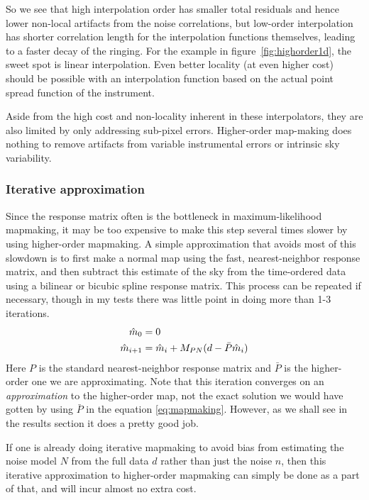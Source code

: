 \documentclass{article}
\begin{document}
So we see that high interpolation order has smaller total residuals and hence lower
non-local artifacts from the noise correlations, but low-order interpolation has shorter
correlation length for the interpolation functions themselves, leading to a faster decay of
the ringing. For the example in figure~\ref{fig:highorder1d}, the sweet spot is linear interpolation.
Even better locality (at even higher cost) should be possible with an interpolation
function based on the actual point spread function of the instrument.

Aside from the high cost and non-locality inherent in these interpolators, they are also
limited by only addressing sub-pixel errors. Higher-order map-making does nothing to remove
artifacts from variable instrumental errors or intrinsic sky variability.

\subsubsection{Iterative approximation}
Since the response matrix often is the bottleneck in maximum-likelihood mapmaking,
it may be too expensive to make this step several times slower by using higher-order
mapmaking. A simple approximation that avoids most of this slowdown is to first make
a normal map using the fast, nearest-neighbor response matrix, and then subtract this
estimate of the sky from the time-ordered data using a bilinear or bicubic spline
response matrix. This process can be repeated if necessary, though in my tests there
was little point in doing more than 1-3 iterations.
\begin{align}
\hat m_0 &= 0 \notag \\
\hat m_{i+1} &= \hat m_i + M_{PN}(d - \bar P \hat m_i) \label{eq:iterative}
\end{align}
Here $P$ is the standard nearest-neighbor response matrix and $\bar P$ is
the higher-order one we are approximating. Note that this iteration converges
on an \emph{approximation} to the higher-order map, not the exact solution
we would have gotten by using $\bar P$ in the equation \ref{eq:mapmaking}.
However, as we shall see in the results section it does a pretty good job.

If one is already doing iterative mapmaking to avoid bias from
estimating the noise model $N$ from the full data $d$ rather than
just the noise $n$, then this iterative approximation to higher-order mapmaking
can simply be done as a part of that, and will incur almost no extra cost.
\end{document}
